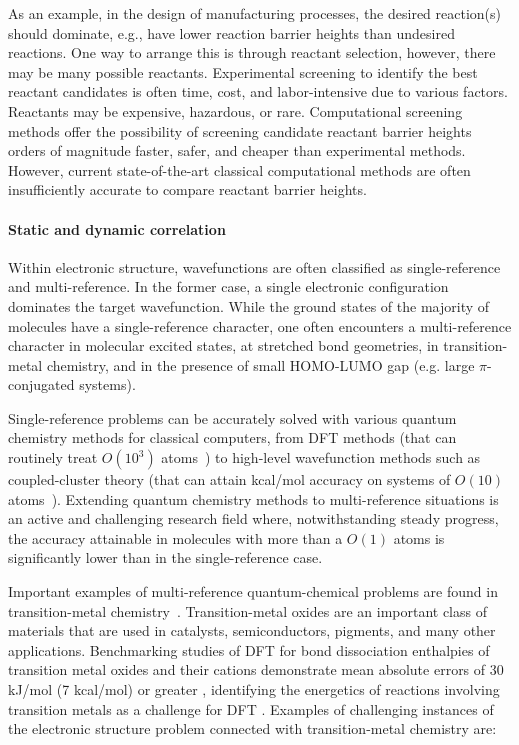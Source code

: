 As an example, in the design of manufacturing processes, the desired reaction(s) should dominate, e.g., have lower reaction barrier heights than undesired reactions.  One way to arrange this is through reactant selection, however, there may be many possible reactants.  Experimental screening to identify the best reactant candidates is often time, cost, and labor-intensive due to various factors.  Reactants may be expensive, hazardous, or rare.  Computational screening methods offer the possibility of screening candidate reactant barrier heights orders of magnitude faster, safer, and cheaper than experimental methods.  However, current state-of-the-art classical computational methods are often insufficiently accurate to compare reactant barrier heights.

\paragraph{Static and dynamic correlation}

Within electronic structure, wavefunctions are often classified as single-reference and multi-reference. In the former case, a single electronic configuration dominates the target wavefunction.
While the ground states of the majority of molecules have a single-reference character, one often encounters a multi-reference character in molecular excited states, at stretched bond geometries, in transition-metal chemistry, and in the presence of small HOMO-LUMO gap (e.g. large $\pi$-conjugated systems).

Single-reference problems can be accurately solved with various quantum chemistry methods for classical computers, from DFT methods (that can routinely treat $O(10^3)$ atoms~\cite{jones2015density})
to high-level wavefunction methods such as coupled-cluster theory (that can attain kcal/mol accuracy on systems of $O(10)$ atoms~\cite{sparta2014chemical}).
Extending quantum chemistry methods to multi-reference situations is an active and challenging research field where, notwithstanding steady progress, the accuracy attainable in molecules with more than a $O(1)$ atoms is significantly lower than in the single-reference case.

Important examples of multi-reference quantum-chemical problems are found in transition-metal chemistry~\cite{doi:10.1021/acs.jctc.9b00674,ciapprox-1}. Transition-metal oxides are an important class of materials that are used in catalysts, semiconductors, pigments, and many other applications.  Benchmarking studies of DFT for bond dissociation enthalpies of transition metal oxides and their cations demonstrate mean absolute errors of 30 kJ/mol (7 kcal/mol) or greater \cite{moltved2019performance}, identifying the energetics of reactions involving transition metals as a challenge for DFT \cite{moltved2019performance}. Examples of challenging instances of the electronic structure problem connected with transition-metal chemistry are:

